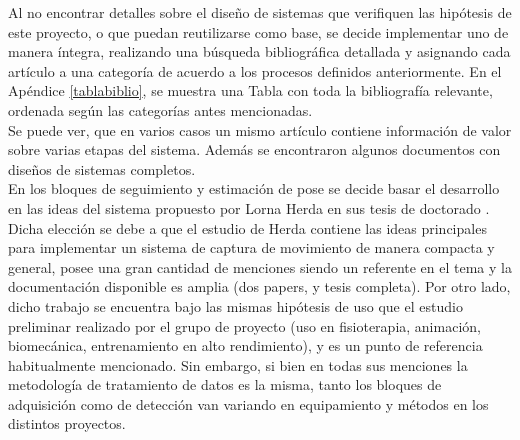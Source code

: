 Al no encontrar detalles sobre el diseño de sistemas que verifiquen las hipótesis de este proyecto, o que puedan reutilizarse como base, se decide implementar uno de manera íntegra, realizando una búsqueda bibliográfica detallada y asignando cada artículo a una categoría de acuerdo a los procesos definidos anteriormente. En el Apéndice \ref{tablabiblio}, se muestra una Tabla con toda la bibliografía relevante, ordenada según las categorías antes mencionadas.
\\ 



Se puede ver, que en varios casos un mismo artículo contiene información de valor sobre varias etapas del sistema. Además se encontraron algunos documentos con diseños de sistemas completos.
\\ 

En los bloques de seguimiento y estimación de pose se decide basar el desarrollo en las ideas del sistema propuesto por Lorna Herda en sus tesis de doctorado \cite{herda}. Dicha elección se debe a que el estudio de Herda contiene las ideas principales para implementar un sistema de captura de movimiento de manera compacta y general, posee una gran cantidad de menciones siendo un referente en el tema y la documentación disponible es amplia (dos papers, y tesis completa). Por otro lado, dicho trabajo se encuentra bajo las mismas hipótesis de uso que el estudio preliminar realizado por el grupo de proyecto (uso en fisioterapia, animación, biomecánica, entrenamiento en alto rendimiento), y es un punto de referencia habitualmente mencionado. Sin embargo, si bien en todas sus menciones la metodología de tratamiento de datos es la misma, tanto los bloques de adquisición como de detección van variando en equipamiento y métodos en los distintos proyectos.







